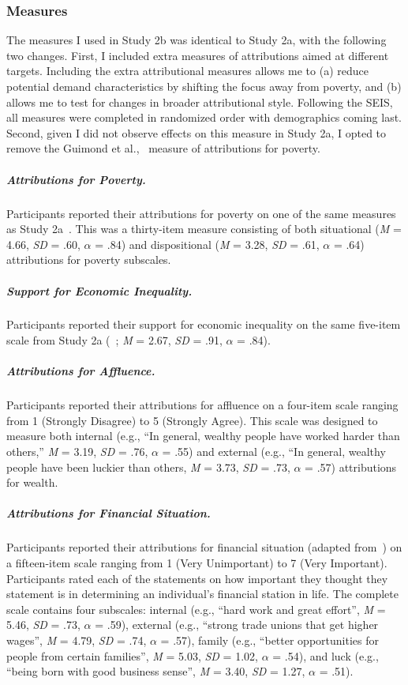 \documentclass{sfuthesis}
\begin{document}
\subsubsection{Measures}

The measures I used in Study 2b was identical to Study 2a, with the following two changes. First, I included extra measures of attributions aimed at different targets. Including the extra attributional measures allows me to (a) reduce potential demand characteristics by shifting the focus away from poverty, and (b) allows me to test for changes in broader attributional style. Following the SEIS, all measures were completed in randomized order with demographics coming last. Second, given I did not observe effects on this measure in Study 2a, I opted to remove the Guimond et al.,~\cite{guimond89} measure of attributions for poverty.

\subparagraph{Attributions for Poverty.} Participants reported their attributions for poverty on one of the same measures as Study 2a~\cite{nickols11}. This was a thirty-item measure consisting of both situational (\textit{M} = 4.66, \textit{SD} = .60, $\alpha$ = .84) and dispositional (\textit{M} = 3.28, \textit{SD} = .61, $\alpha$ = .64) attributions for poverty subscales.

\subparagraph{Support for Economic Inequality.} Participants reported their support for economic inequality on the same five-item scale from Study 2a (~\cite{wiwadunpub}; \textit{M} = 2.67, \textit{SD} = .91, $\alpha$ = .84).

\subparagraph{Attributions for Affluence.} Participants reported their attributions for affluence on a four-item scale ranging from 1 (Strongly Disagree) to 5 (Strongly Agree). This scale was designed to measure both internal (e.g., “In general, wealthy people have worked harder than others,” \textit{M} = 3.19, \textit{SD} = .76, $\alpha$ = .55) and external (e.g., “In general, wealthy people have been luckier than others, \textit{M} = 3.73, \textit{SD} = .73, $\alpha$ = .57) attributions for wealth.

\subparagraph{Attributions for Financial Situation.} Participants reported their attributions for financial situation (adapted from~\cite{forgas82}) on a fifteen-item scale ranging from 1 (Very Unimportant) to 7 (Very Important). Participants rated each of the statements on how important they thought they statement is in determining an individual’s financial station in life. The complete scale contains four subscales: internal (e.g., “hard work and great effort”, \textit{M} = 5.46, \textit{SD} = .73, $\alpha$ = .59), external (e.g., “strong trade unions that get higher wages”, \textit{M} = 4.79, \textit{SD} = .74, $\alpha$ = .57), family (e.g., “better opportunities for people from certain families”, \textit{M} = 5.03, \textit{SD} = 1.02, $\alpha$ = .54), and luck (e.g., “being born with good business sense”, \textit{M} = 3.40, \textit{SD} = 1.27, $\alpha$ = .51).
\end{document}
